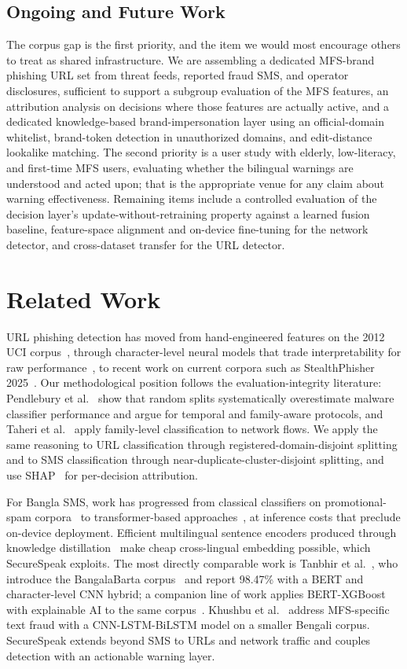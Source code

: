 \documentclass[manuscript,screen,review]{acmart}
\begin{document}
\subsection{Ongoing and Future Work}
The corpus gap is the first priority, and the item we would most encourage others to treat as shared infrastructure. We are assembling a dedicated MFS-brand phishing URL set from threat feeds, reported fraud SMS, and operator disclosures, sufficient to support a subgroup evaluation of the MFS features, an attribution analysis on decisions where those features are actually active, and a dedicated knowledge-based brand-impersonation layer using an official-domain whitelist, brand-token detection in unauthorized domains, and edit-distance lookalike matching. The second priority is a user study with elderly, low-literacy, and first-time MFS users, evaluating whether the bilingual warnings are understood and acted upon; that is the appropriate venue for any claim about warning effectiveness. Remaining items include a controlled evaluation of the decision layer's update-without-retraining property against a learned fusion baseline, feature-space alignment and on-device fine-tuning for the network detector, and cross-dataset transfer for the URL detector.

\section{Related Work}
URL phishing detection has moved from hand-engineered features on the 2012 UCI corpus~\cite{mohammad2014}, through character-level neural models that trade interpretability for raw performance~\cite{sahingoz2019}, to recent work on current corpora such as StealthPhisher 2025~\cite{stealthphisher}. Our methodological position follows the evaluation-integrity literature: Pendlebury et al.~\cite{pendlebury2019} show that random splits systematically overestimate malware classifier performance and argue for temporal and family-aware protocols, and Taheri et al.~\cite{taheri2019} apply family-level classification to network flows. We apply the same reasoning to URL classification through registered-domain-disjoint splitting and to SMS classification through near-duplicate-cluster-disjoint splitting, and use SHAP~\cite{lundberg2017} for per-decision attribution.

For Bangla SMS, work has progressed from classical classifiers on promotional-spam corpora~\cite{khan2023} to transformer-based approaches~\cite{foysal2025}, at inference costs that preclude on-device deployment. Efficient multilingual sentence encoders produced through knowledge distillation~\cite{reimers2020} make cheap cross-lingual embedding possible, which SecureSpeak exploits. The most directly comparable work is Tanbhir et al.~\cite{tanbhir2024}, who introduce the BangalaBarta corpus~\cite{bangalabarta} and report 98.47\% with a BERT and character-level CNN hybrid; a companion line of work applies BERT-XGBoost with explainable AI to the same corpus~\cite{nirapodbarta}. Khushbu et al.~\cite{khushbu2024} address MFS-specific text fraud with a CNN-LSTM-BiLSTM model on a smaller Bengali corpus. SecureSpeak extends beyond SMS to URLs and network traffic and couples detection with an actionable warning layer.
\end{document}
